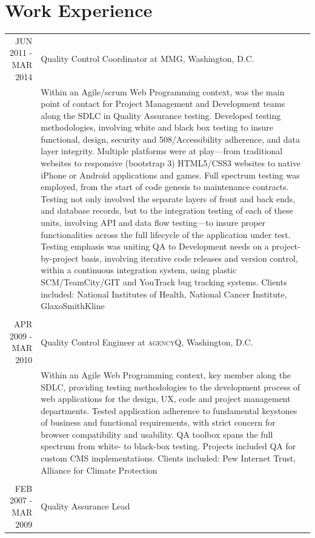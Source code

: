 \documentclass[a4paper,10pt]{article}
\begin{document}
\section{Work Experience}
\begin{tabular}{r|p{11cm}}
 \textsc{JUN 2011 - MAR 2014} & Quality Control Coordinator
 at \textsc{MMG}, Washington, D.C. \\&\footnotesize{Within an Agile/scrum Web Programming context, was the main point of contact for Project Management and Development teams along the SDLC in Quality Assurance testing. Developed testing methodologies, involving white and black box testing to insure functional, design, security and 508/Accessibility adherence, and data layer integrity. Multiple platforms were at play—from traditional websites to responsive (bootstrap 3) HTML5/CSS3 websites to native iPhone or Android applications and games. Full spectrum testing was employed, from the start of code genesis to maintenance contracts. Testing not only involved the separate layers of front and back ends, and database records, but to the integration testing of each of these units, involving API and data flow testing—to insure proper functionalities across the full lifecycle of the application under test. Testing emphasis 
was uniting QA to Development needs on a project-by-project basis, involving iterative code releases and version control, within a 
continuous integration system, using plastic SCM/TeamCity/GIT and YouTrack bug tracking systems.
Clients included: National Institutes of Health, National Cancer Institute, 
GlaxoSmithKline}\\\multicolumn{2}{c}{} \\
\textsc{APR 2009 - MAR 2010} & Quality Control Engineer
at \textsc{agencyQ}, Washington, D.C.\\&\footnotesize{Within an Agile Web Programming context, key member along the SDLC, providing testing methodologies to the development process of web applications for the design, UX, code and project management departments. Tested application adherence to fundamental keystones of business and functional requirements, with strict concern for browser compatibility and usability.  QA toolbox spans the full spectrum from white- to black-box testing. Projects included QA for custom CMS implementations.
Clients included: Pew Internet Trust, Alliance for Climate Protection}\\\multicolumn{2}{c}{} \\
\textsc{FEB 2007 - MAR 2009} & Quality Assurance Lead

\end{tabular}
\end{document}
